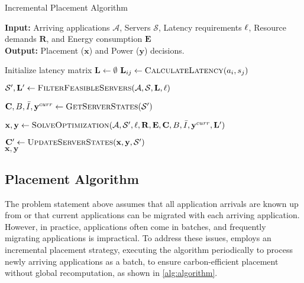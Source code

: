 \begin{algorithm}[t]
\scriptsize
\caption{\proposedsystem Incremental Placement Algorithm}
\label{alg:algorithm}
\raggedright
\textbf{Input:} Arriving applications $\mathcal{A}$,  Servers $\mathcal{S}$, Latency requirements $\boldmath{\ell}$, Resource demands $\mathbf{R}$, and Energy consumption $\mathbf{E}$ \\
\textbf{Output:} Placement ($\mathbf{x}$) and Power ($\mathbf{y}$) decisions.
\begin{algorithmic}[1]
\State Initialize latency matrix $\mathbf{L} \gets \emptyset$
\State $\mathbf{L}_{ij} \gets \textsc{CalculateLatency}(a_i, s_j)$ \label{ln:latency_calc} 
\EndFor
\EndFor

\State $\mathcal{S}', \mathbf{L}' \gets \textsc{FilterFeasibleServers}(\mathcal{A}, \mathcal{S}, \mathbf{L}, \boldmath{\ell})$ \label{ln:preprocess} 

\State $\mathbf{C}, B, \bar{I}, \mathbf{y}^{curr} \gets \textsc{GetServerStates}(\mathcal{S}')$ 

\State $\mathbf{x}, \mathbf{y} \gets \textsc{SolveOptimization}(\mathcal{A}, \mathcal{S}', \boldmath{\ell}, \mathbf{R}, \mathbf{E}, \mathbf{C}, B, \bar{I} , \mathbf{y}^{curr}, \mathbf{L}')$ \label{ln:solve}

\State $\mathbf{C}' \gets \textsc{UpdateServerStates}(\mathbf{x}, \mathbf{y}, \mathcal{S}')$ \label{ln:update}
  \\

\Return $\mathbf{x}, \mathbf{y}$
\end{algorithmic}
\end{algorithm}


\subsection{\proposedsystem Placement Algorithm}\label{sec:design_algorithm}
The problem statement above assumes that all application arrivals are known up from or that current applications can be migrated with each arriving application. However, in practice, applications often come in batches, and frequently migrating applications is impractical. 
To address these issues, \proposedsystem employs an incremental placement strategy, executing the algorithm periodically to process newly arriving applications as a batch, to ensure carbon-efficient placement without global recomputation, as shown in \autoref{alg:algorithm}.

